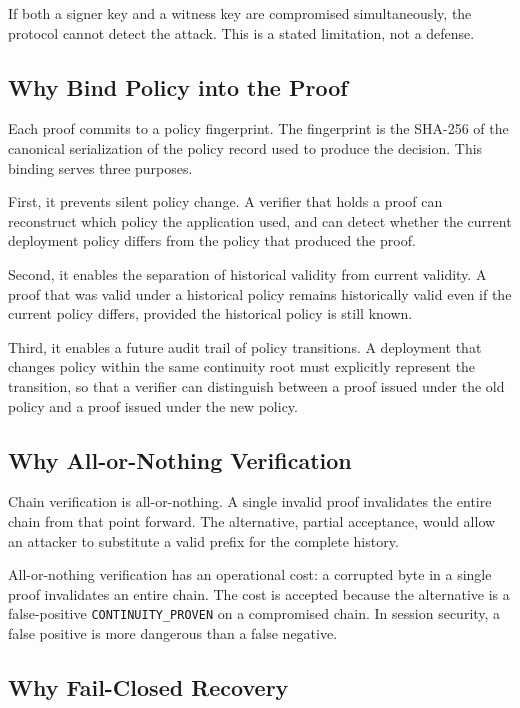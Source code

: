 \documentclass[11pt,a4paper]{article}
\begin{document}
If both a signer key and a witness key are compromised simultaneously, the protocol cannot detect the attack. This is a stated limitation, not a defense.

\subsection{Why Bind Policy into the Proof}

Each proof commits to a policy fingerprint. The fingerprint is the SHA-256 of the canonical serialization of the policy record used to produce the decision. This binding serves three purposes.

First, it prevents silent policy change. A verifier that holds a proof can reconstruct which policy the application used, and can detect whether the current deployment policy differs from the policy that produced the proof.

Second, it enables the separation of historical validity from current validity. A proof that was valid under a historical policy remains historically valid even if the current policy differs, provided the historical policy is still known.

Third, it enables a future audit trail of policy transitions. A deployment that changes policy within the same continuity root must explicitly represent the transition, so that a verifier can distinguish between a proof issued under the old policy and a proof issued under the new policy.

\subsection{Why All-or-Nothing Verification}

Chain verification is all-or-nothing. A single invalid proof invalidates the entire chain from that point forward. The alternative, partial acceptance, would allow an attacker to substitute a valid prefix for the complete history.

All-or-nothing verification has an operational cost: a corrupted byte in a single proof invalidates an entire chain. The cost is accepted because the alternative is a false-positive \texttt{CONTINUITY\_PROVEN} on a compromised chain. In session security, a false positive is more dangerous than a false negative.

\subsection{Why Fail-Closed Recovery}
\end{document}
